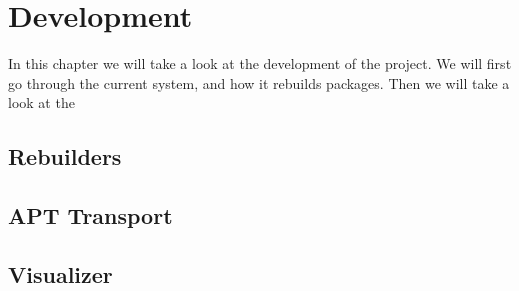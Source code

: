 \documentclass[../Main/thesis.tex]{subfiles}
\begin{document}
\chapter{Development}\label{ch:development}
In this chapter we will take a look at the development of the project. We will
first go through the current system, and how it rebuilds packages. Then we will
take a look at the 

\section{Rebuilders}\label{sec:development_rebuilders}
\section{APT Transport}\label{sec:apt_transport}
\section{Visualizer}\label{sec:visualizer}
\blankpage
\end{document}
